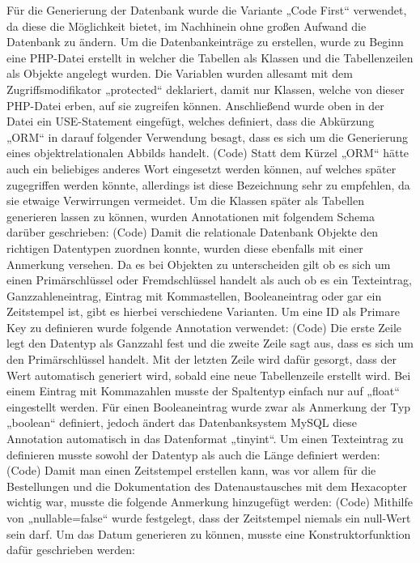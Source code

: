 	Für die Generierung der Datenbank wurde die Variante „Code First“ verwendet, da diese die Möglichkeit bietet, im Nachhinein ohne großen Aufwand die Datenbank zu ändern.
	Um die Datenbankeinträge zu erstellen, wurde zu Beginn eine PHP-Datei erstellt in welcher die Tabellen als Klassen und die Tabellenzeilen als Objekte angelegt wurden. Die Variablen wurden allesamt mit dem Zugriffsmodifikator „protected“ deklariert, damit nur Klassen, welche von dieser PHP-Datei erben, auf sie zugreifen können. Anschließend wurde oben in der Datei ein USE-Statement eingefügt, welches definiert, dass die Abkürzung „ORM“ in darauf folgender Verwendung besagt, dass es sich um die Generierung eines objektrelationalen Abbilds handelt.
	(Code)
	Statt dem Kürzel „ORM“ hätte auch ein beliebiges anderes Wort eingesetzt werden können, auf welches später zugegriffen werden könnte, allerdings ist diese Bezeichnung sehr zu empfehlen, da sie etwaige Verwirrungen vermeidet.
	Um die Klassen später als Tabellen generieren lassen zu können, wurden Annotationen mit folgendem Schema darüber geschrieben:
	(Code)
	Damit die relationale Datenbank Objekte den richtigen Datentypen zuordnen konnte, wurden diese ebenfalls mit einer Anmerkung versehen. Da es bei Objekten zu unterscheiden gilt ob es sich um einen Primärschlüssel oder Fremdschlüssel handelt als auch ob es ein Texteintrag, Ganzzahleneintrag, Eintrag mit Kommastellen, Booleaneintrag oder gar ein Zeitstempel ist, gibt es hierbei verschiedene Varianten.
	Um eine ID als Primare Key zu definieren wurde folgende Annotation verwendet:
	(Code)
	Die erste Zeile legt den Datentyp als Ganzzahl fest und die zweite Zeile sagt aus, dass es sich um den Primärschlüssel handelt. Mit der letzten Zeile wird dafür gesorgt, dass der Wert automatisch generiert wird, sobald eine neue Tabellenzeile erstellt wird.
	Bei einem Eintrag mit Kommazahlen musste der Spaltentyp einfach nur auf „float“ eingestellt werden. Für einen Booleaneintrag wurde zwar als Anmerkung der Typ „boolean“ definiert, jedoch ändert das Datenbanksystem MySQL diese Annotation automatisch in das Datenformat „tinyint“.
	Um einen Texteintrag zu definieren musste sowohl der Datentyp als auch die Länge definiert werden:
	(Code)
	Damit man einen Zeitstempel erstellen kann, was vor allem für die Bestellungen und die Dokumentation des Datenaustausches mit dem Hexacopter wichtig war, musste die folgende Anmerkung hinzugefügt werden:
	(Code)
	Mithilfe von „nullable=false“ wurde festgelegt, dass der Zeitstempel niemals ein null-Wert sein darf.
	Um das Datum generieren zu können, musste eine Konstruktorfunktion dafür geschrieben werden:
